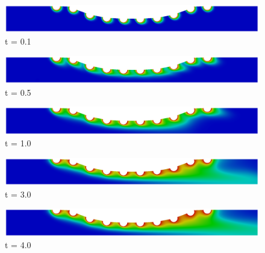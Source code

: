 \begin{figure}[H]
     \begin{minipage}{.50\linewidth}
      \centering
      \includegraphics[scale=0.12]{./02_chaps/cap_solution/figure/conc1_CurvedStrut200.png}\\
      t = 0.1
     \end{minipage}%
     \begin{minipage}{.50\linewidth}
      \centering
      \includegraphics[scale=0.12]{./02_chaps/cap_solution/figure/conc1_CurvedStrut1000.png}\\
      t = 0.5
     \end{minipage}
     \begin{minipage}{.50\linewidth}
     \medskip
      \centering
      \includegraphics[scale=0.12]{./02_chaps/cap_solution/figure/conc1_CurvedStrut2000.png}\\
      t = 1.0
     \end{minipage}%
     \begin{minipage}{.50\linewidth}
     \medskip
      \centering
      \includegraphics[scale=0.12]{./02_chaps/cap_solution/figure/conc1_CurvedStrut6000.png}\\
      t = 3.0
     \end{minipage}
     \begin{minipage}{.50\linewidth}
      \centering
      \includegraphics[scale=0.12]{./02_chaps/cap_solution/figure/conc1_CurvedStrut8000.png}\\
      t = 4.0
     \end{minipage}%

\end{figure}
